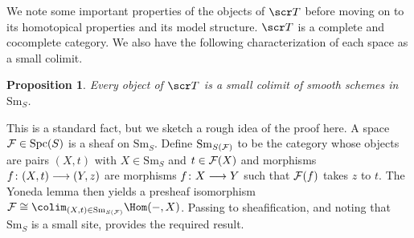 \documentclass{amsart}
\newtheorem{prop}{Proposition}[section]
\theoremstyle{definition}
\begin{document}
We note some important properties of the objects of $\sT$ before moving on to its homotopical properties and its model structure. $\sT$ is a complete and cocomplete category. We also have the following characterization of each space as a small colimit.
\begin{prop}\label{prop:1.1}
Every object of $\sT$ is a small colimit of smooth schemes in $\mathrm{Sm}_S$. 
\end{prop}

This is a standard fact, but we sketch a rough idea of the proof here. A space ${\mathcal{F}} \in \mathrm{Spc}(S)$ is a sheaf on $\mathrm{Sm}_S$. Define $\mathrm{Sm}_{S({\mathcal{F}})}$ to be the category whose objects are pairs $(X,t)$ with $X \in \mathrm{Sm}_S$ and $t \in {\mathcal{F}}(X)$ and morphisms $f \colon (X,t) \longrightarrow (Y,z)$ are morphisms $f \colon X \longrightarrow Y$ such that ${\mathcal{F}}(f)$ takes $z$ to $t$. The Yoneda lemma then yields a presheaf isomorphism $\oF \iso \colim_{(X,t) \in \mathrm{Sm}_{S(\oF)}} \Hom(-,X)$. Passing to sheafification, and noting that $\mathrm{Sm}_S$ is a small site, provides the required result.\\
\end{document}
